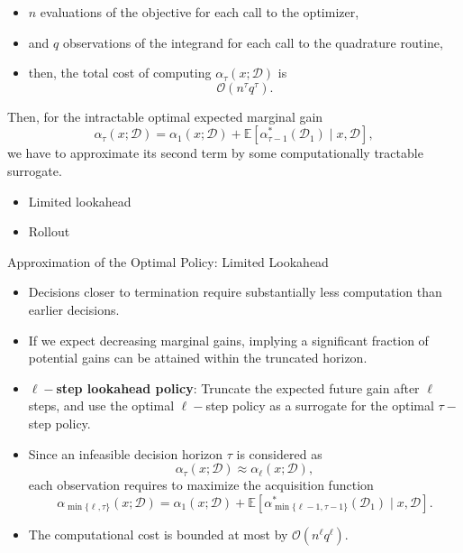 \documentclass[9pt]{beamer}
\begin{document}
\begin{frame}
  \begin{itemize}
    \item $n$ evaluations of the objective for each call to the optimizer,
    \item and $q$ observations of the integrand for each call to the quadrature routine,
    \item[$\Rightarrow$] then, the total cost of computing $\alpha_\tau(x; \mathcal{D})$ is
    \[
      \mathcal{O}(n^\tau q^\tau).
    \]
  \end{itemize}
  \vspace{2.0em}
  Then, for the intractable optimal expected marginal gain 
  \[
    \alpha_\tau(x; \mathcal{D}) = \alpha_1(x; \mathcal{D}) + \mathbb{E}[\alpha_{\tau-1}^*(\mathcal{D}_1) \mid x, \mathcal{D}],
  \] 
  we have to approximate its second term by some computationally tractable surrogate.
  \begin{itemize}
    \item Limited lookahead
    \item Rollout
  \end{itemize}
\end{frame}

\begin{frame}{Approximation of the Optimal Policy: Limited Lookahead}
  \begin{itemize}
    \item Decisions closer to termination require substantially less computation than earlier decisions.
    \item If we expect decreasing marginal gains, implying a significant fraction of potential gains can be attained within the truncated horizon.
    \item[$\Rightarrow$] \textbf{$\ell-$step lookahead policy}: Truncate the expected future gain after $\ell$ steps, 
    and use the optimal $\ell-$step policy as a surrogate for the optimal $\tau-$step policy.
    \newline
    \item Since an infeasible decision horizon $\tau$ is considered as
    \[
      \alpha_\tau(x; \mathcal{D}) \approx \alpha_\ell(x; \mathcal{D}),
    \]
    each observation requires to maximize the acquisition function
    \[
      \alpha_{\min\{\ell, \tau\}}(x; \mathcal{D}) = \alpha_1(x; \mathcal{D}) + \mathbb{E}[\alpha_{\min\{\ell-1, \tau-1\}}^*(\mathcal{D}_1) \mid x, \mathcal{D}].
    \] 
    \item The computational cost is bounded at most by $\mathcal{O}(n^\ell q^\ell)$.
  \end{itemize}
\end{frame}
\end{document}
